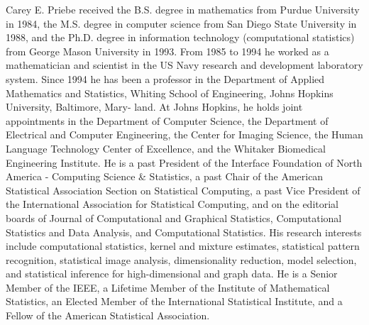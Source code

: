 \documentclass[10pt,draftclsnofoot,onecolumn]{IEEEtran}
\theoremstyle{definition}
\begin{document}
\begin{IEEEbiography}{Carey E. Priebe}
  received the B.S. degree in
  mathematics from Purdue University in 1984, the M.S. degree in
  computer science from San Diego State University in 1988, and the
  Ph.D. degree in information technology (computational statistics)
  from George Mason University in 1993. From 1985 to 1994 he worked as
  a mathematician and scientist in the US Navy research and
  development laboratory system. Since 1994 he has been a professor in
  the Department of Applied Mathematics and Statistics, Whiting School
  of Engineering, Johns Hopkins University, Baltimore, Mary- land. At
  Johns Hopkins, he holds joint appointments in the Department of
  Computer Science, the Department of Electrical and Computer
  Engineering, the Center for Imaging Science, the Human Language
  Technology Center of Excellence, and the Whitaker Biomedical
  Engineering Institute. He is a past President of the Interface
  Foundation of North America - Computing Science \& Statistics, a past
  Chair of the American Statistical Association Section on Statistical
  Computing, a past Vice President of the International Association
  for Statistical Computing, and on the editorial boards of Journal of
  Computational and Graphical Statistics, Computational Statistics and
  Data Analysis, and Computational Statistics. His research interests
  include computational statistics, kernel and mixture estimates,
  statistical pattern recognition, statistical image analysis,
  dimensionality reduction, model selection, and statistical inference
  for high-dimensional and graph data.  He is a Senior Member of the
  IEEE, a Lifetime Member of the Institute of Mathematical Statistics,
  an Elected Member of the International Statistical Institute, and a
  Fellow of the American Statistical Association.

\end{IEEEbiography}
\end{document}
